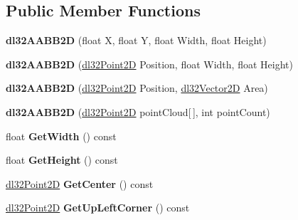 \subsection*{Public Member Functions}
\begin{DoxyCompactItemize}
\item 
\hypertarget{classdl32_a_a_b_b2_d_a3c3940a65641a2b7992ff500dbf93389}{{\bfseries dl32\-A\-A\-B\-B2\-D} (float X, float Y, float Width, float Height)}\label{classdl32_a_a_b_b2_d_a3c3940a65641a2b7992ff500dbf93389}

\item 
\hypertarget{classdl32_a_a_b_b2_d_a6d74d609786fc4bfe7bd2fc7ccd99476}{{\bfseries dl32\-A\-A\-B\-B2\-D} (\hyperlink{structdl32_point2_d}{dl32\-Point2\-D} Position, float Width, float Height)}\label{classdl32_a_a_b_b2_d_a6d74d609786fc4bfe7bd2fc7ccd99476}

\item 
\hypertarget{classdl32_a_a_b_b2_d_a294725e86d259c2220cbf532828f68e4}{{\bfseries dl32\-A\-A\-B\-B2\-D} (\hyperlink{structdl32_point2_d}{dl32\-Point2\-D} Position, \hyperlink{structdl32_vector2_d}{dl32\-Vector2\-D} Area)}\label{classdl32_a_a_b_b2_d_a294725e86d259c2220cbf532828f68e4}

\item 
\hypertarget{classdl32_a_a_b_b2_d_a3339d80ad8b45c83b63ef7cc049e0f3f}{{\bfseries dl32\-A\-A\-B\-B2\-D} (\hyperlink{structdl32_point2_d}{dl32\-Point2\-D} point\-Cloud\mbox{[}$\,$\mbox{]}, int point\-Count)}\label{classdl32_a_a_b_b2_d_a3339d80ad8b45c83b63ef7cc049e0f3f}

\item 
\hypertarget{classdl32_a_a_b_b2_d_ad2d76eafa6393650b660a347caa17128}{float {\bfseries Get\-Width} () const }\label{classdl32_a_a_b_b2_d_ad2d76eafa6393650b660a347caa17128}

\item 
\hypertarget{classdl32_a_a_b_b2_d_ae899831f962f2be0c0348c5a71133b32}{float {\bfseries Get\-Height} () const }\label{classdl32_a_a_b_b2_d_ae899831f962f2be0c0348c5a71133b32}

\item 
\hypertarget{classdl32_a_a_b_b2_d_a2b47167180b43f43e6795f96fc1b7f33}{\hyperlink{structdl32_point2_d}{dl32\-Point2\-D} {\bfseries Get\-Center} () const }\label{classdl32_a_a_b_b2_d_a2b47167180b43f43e6795f96fc1b7f33}

\item 
\hypertarget{classdl32_a_a_b_b2_d_ac54d70215889c58bbaf878ee02e85182}{\hyperlink{structdl32_point2_d}{dl32\-Point2\-D} {\bfseries Get\-Up\-Left\-Corner} () const }\label{classdl32_a_a_b_b2_d_ac54d70215889c58bbaf878ee02e85182}


\end{DoxyCompactItemize}
